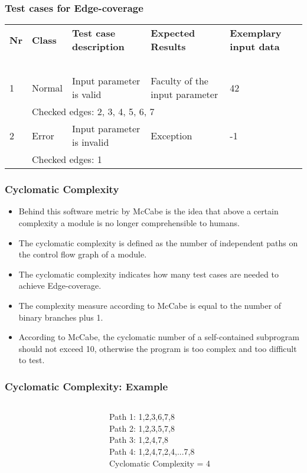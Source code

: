\begin{frame}
\frametitle{Test cases for Edge-coverage}
\begin{tabular}{llp{}p{}p{}}
\textbf{Nr} & \textbf{Class} & \textbf{Test case description} & \textbf{Expected Results}  & \textbf{Exemplary input data} \\
~\\
1           & Normal          & Input parameter is valid	& Faculty of the input parameter	& 42 \\
            & \multicolumn{4}{l}{Checked edges: 2, 3, 4, 5, 6, 7} \\[2em]
2           & Error          & Input parameter is invalid   & Exception & -1 \\
            & \multicolumn{4}{l}{Checked edges: 1}
\end{tabular}
\end{frame}


\begin{frame}
\frametitle{Cyclomatic Complexity}
\begin{itemize}
  \item Behind this software metric by McCabe is the idea that above a certain complexity a module is no longer comprehensible to humans. 
  \item The cyclomatic complexity is defined as the number of independent paths on the control flow graph of a module.
  \item The cyclomatic complexity indicates how many test cases are needed to achieve Edge-coverage.
  \item The complexity measure according to McCabe is equal to the number of binary branches plus 1.
  \item According to McCabe, the cyclomatic number of a self-contained subprogram should not exceed 10, otherwise the program is too complex and too difficult to test.
\end{itemize}
\end{frame}


\begin{frame}
\frametitle{Cyclomatic Complexity: Example}
\begin{columns}
\begin{column}{0.5\textwidth}
\begin{center}
\end{center}
\end{column}
\begin{column}{0.5\textwidth}
\pause
Path 1:  1,2,3,6,7,8\\
\pause
Path 2:  1,2,3,5,7,8\\
\pause
Path 3:  1,2,4,7,8\\
\pause
Path 4:  1,2,4,7,2,4,...7,8\\
\bigskip\bigskip
Cyclomatic Complexity = 4
\end{column}
\end{columns}
\end{frame}



